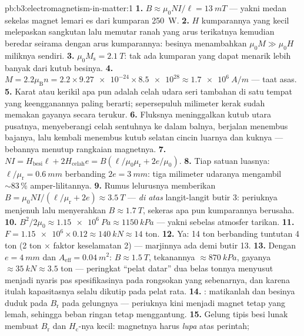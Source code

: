 \begin{solution}{pb:b3:electromagnetism-in-matter:1}
\textbf{1.} $B \approx \mu_0NI/\ell = \qty{13}{mT}$ --- yakni medan
sekelas magnet lemari es dari kumparan \qty{250}{W}.
\textbf{2.} $H$ kumparannya yang kecil melepaskan sangkutan lalu memutar
ranah yang arus terikatnya kemudian beredar seirama dengan arus
kumparannya: besinya menambahkan $\mu_0M \gg \mu_0H$ miliknya sendiri.
\textbf{3.} $\mu_0M_{\text{s}} = \qty{2.1}{T}$: tak ada kumparan yang
dapat menarik lebih banyak dari kutub besinya.
\textbf{4.} $M = 2.2\mu_{\text{B}}n = 2.2\times\num{9.27e-24}
\times\num{8.5e28} \approx \qty{1.7e6}{A/m}$ --- taat asas.
\textbf{5.} Karat atau kerikil apa pun adalah celah udara seri tambahan di
satu tempat yang keengganannya paling berarti; sepersepuluh milimeter
kerak sudah memakan gayanya secara terukur.
\textbf{6.} Fluksnya meninggalkan kutub utara pusatnya, menyeberangi
celah sentuhnya ke dalam balnya, berjalan menembus bajanya, lalu kembali
menembus kutub selatan cincin luarnya dan kuknya --- bebannya
menutup rangkaian magnetnya.
\textbf{7.} $NI = H_{\text{besi}}\ell + 2H_{\text{celah}}e =
B(\ell/\mu_0\mu_{\text{r}} + 2e/\mu_0)$.
\textbf{8.} Tiap satuan luasnya: $\ell/\mu_{\text{r}} = \qty{0.6}{mm}$
berbanding $2e = \qty{3}{mm}$: tiga milimeter udaranya mengambil
$\sim83\,\%$ amper-lilitannya.
\textbf{9.} Rumus lelurusnya memberikan $B = \mu_0NI/(\ell/
\mu_{\text{r}} + 2e) \approx \qty{3.5}{T}$ --- \emph{di atas}
langit-langit butir 3: periuknya menjenuh lalu menyerahkan $B \approx
\qty{1.7}{T}$, sekeras apa pun kumparannya berusaha.
\textbf{10.} $B^2/2\mu_0 \approx \qty{1.15e6}{Pa} \approx
\qty{1150}{kPa}$ --- yakni sebelas atmosfer tarikan.
\textbf{11.} $F = \num{1.15e6}\times0.12 \approx \qty{140}{kN}
\approx 14$ ton.
\textbf{12.} Ya: 14 ton berbanding tuntutan 4 ton
(2 ton $\times$ faktor keselamatan 2) --- marjinnya ada demi
butir 13.
\textbf{13.} Dengan $e = \qty{4}{mm}$ dan $A_{\text{eff}} =
\qty{0.04}{m^2}$: $B \approx \qty{1.5}{T}$, tekanannya
$\approx\qty{870}{kPa}$, gayanya $\approx\qty{35}{kN} \approx 3.5$
ton --- peringkat ``pelat datar'' dua belas tonnya menyusut menjadi
nyaris pas spesifikasinya pada rongsokan yang sebenarnya, dan karena itulah
kapasitasnya selalu dikutip pada pelat rata.
\textbf{14.} : matikanlah dan besinya duduk pada
$B_{\text{r}}$ pada gelungnya --- periuknya kini menjadi magnet tetap yang
lemah, sehingga beban ringan tetap menggantung.
\textbf{15.} Gelung tipis besi lunak membuat $B_{\text{r}}$ dan
$H_{\text{c}}$-nya kecil: magnetnya harus \emph{lupa} atas perintah;

\end{solution}
